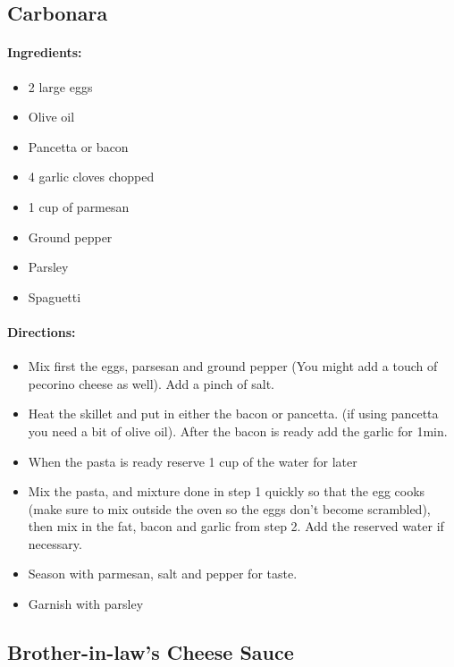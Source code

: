 \documentclass{article}
\begin{document}
\subsection{Carbonara}

\paragraph{Ingredients:}
\begin{itemize}
    \item 2 large eggs
    \item Olive oil
    \item Pancetta or bacon
    \item 4 garlic cloves chopped
    \item 1 cup of parmesan
    \item Ground pepper
    \item Parsley
    \item Spaguetti
\end{itemize}

\paragraph{Directions:}
\begin{itemize}
    \item Mix first the eggs, parsesan and ground pepper (You might add a touch of pecorino cheese as well). Add a pinch of salt.
    \item Heat the skillet and put in either the bacon or pancetta. (if using pancetta you need a bit of olive oil). After the bacon is ready add the garlic for 1min.
    \item When the pasta is ready reserve 1 cup of the water for later
    \item Mix the pasta, and mixture done in step 1 quickly so that the egg cooks (make sure to mix outside the oven so the eggs don’t become scrambled), then mix in the fat, bacon and garlic from step 2. Add the reserved water if necessary.
    \item Season with parmesan, salt and pepper for taste.
    \item Garnish with parsley
\end{itemize}

\subsection{Brother-in-law’s Cheese Sauce}
\end{document}
